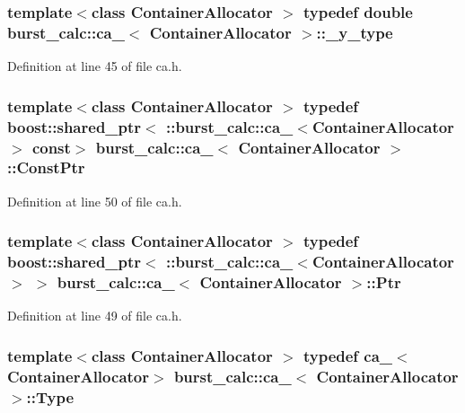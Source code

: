 \subsubsection[{\-\_\-y\-\_\-type}]{\setlength{\rightskip}{0pt plus 5cm}template$<$class Container\-Allocator $>$ typedef double {\bf burst\-\_\-calc\-::ca\-\_\-}$<$ \-Container\-Allocator $>$\-::{\bf \-\_\-y\-\_\-type}}\label{structburst__calc_1_1ca___a01705b9950ea03f9bfb5069dfa1c8d7c}


\-Definition at line 45 of file ca.\-h.

\subsubsection[{\-Const\-Ptr}]{\setlength{\rightskip}{0pt plus 5cm}template$<$class Container\-Allocator $>$ typedef boost\-::shared\-\_\-ptr$<$ \-::{\bf burst\-\_\-calc\-::ca\-\_\-}$<$\-Container\-Allocator$>$ const$>$ {\bf burst\-\_\-calc\-::ca\-\_\-}$<$ \-Container\-Allocator $>$\-::{\bf \-Const\-Ptr}}\label{structburst__calc_1_1ca___a875c7786f91e861c752cb4eef19f46df}


\-Definition at line 50 of file ca.\-h.

\subsubsection[{\-Ptr}]{\setlength{\rightskip}{0pt plus 5cm}template$<$class Container\-Allocator $>$ typedef boost\-::shared\-\_\-ptr$<$ \-::{\bf burst\-\_\-calc\-::ca\-\_\-}$<$\-Container\-Allocator$>$ $>$ {\bf burst\-\_\-calc\-::ca\-\_\-}$<$ \-Container\-Allocator $>$\-::{\bf \-Ptr}}\label{structburst__calc_1_1ca___a5f8d6de369b32db8d495e23669bcab69}


\-Definition at line 49 of file ca.\-h.

\subsubsection[{\-Type}]{\setlength{\rightskip}{0pt plus 5cm}template$<$class Container\-Allocator $>$ typedef {\bf ca\-\_\-}$<$\-Container\-Allocator$>$ {\bf burst\-\_\-calc\-::ca\-\_\-}$<$ \-Container\-Allocator $>$\-::{\bf \-Type}}\label{structburst__calc_1_1ca___a1fc19f17fa40447d78634c44938632c2}



